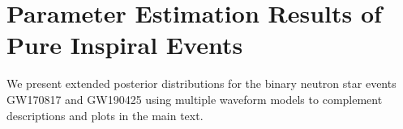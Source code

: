 \documentclass[aps,prd,twocolumn,superscriptaddress,groupedaddress,nofootinbib,showpacs,eqsecnum,useAms]{revtex4-2}
\begin{document}
\begin{figure}[ht!]
{    }
\label{fig:injection_recovery_appendix_GW190425}
\end{figure}


\section{Parameter Estimation Results of Pure Inspiral Events}

We present extended posterior distributions for the binary neutron star events GW170817 and GW190425 using multiple waveform models to complement descriptions and plots in the main text.
\end{document}
